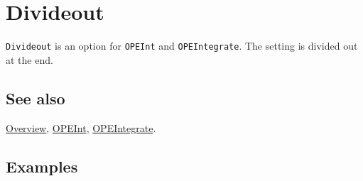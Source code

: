 \documentclass[../FeynCalcManual.tex]{subfiles}
\begin{document}
\hypertarget{divideout}{
\section{Divideout}\label{divideout}}

\texttt{Divideout} is an option for \texttt{OPEInt} and
\texttt{OPEIntegrate}. The setting is divided out at the end.

\subsection{See also}

\hyperlink{toc}{Overview}, \hyperlink{opeint}{OPEInt},
\hyperlink{opeintegrate}{OPEIntegrate}.

\subsection{Examples}
\end{document}
